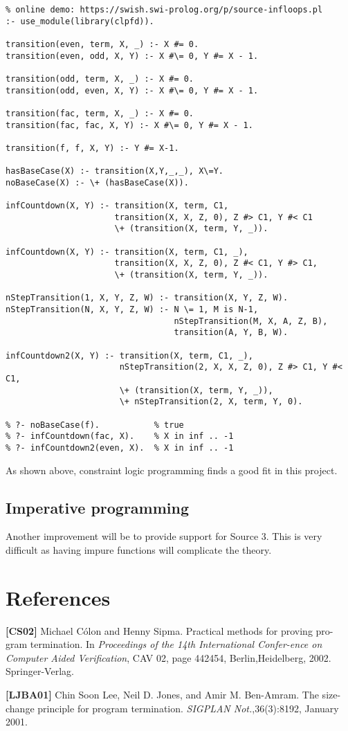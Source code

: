 \begin{lstlisting}
% online demo: https://swish.swi-prolog.org/p/source-infloops.pl 
:- use_module(library(clpfd)).

transition(even, term, X, _) :- X #= 0.
transition(even, odd, X, Y) :- X #\= 0, Y #= X - 1.

transition(odd, term, X, _) :- X #= 0.
transition(odd, even, X, Y) :- X #\= 0, Y #= X - 1.

transition(fac, term, X, _) :- X #= 0.
transition(fac, fac, X, Y) :- X #\= 0, Y #= X - 1.

transition(f, f, X, Y) :- Y #= X-1.

hasBaseCase(X) :- transition(X,Y,_,_), X\=Y.
noBaseCase(X) :- \+ (hasBaseCase(X)).

infCountdown(X, Y) :- transition(X, term, C1, 
                      transition(X, X, Z, 0), Z #> C1, Y #< C1
                      \+ (transition(X, term, Y, _)).

infCountdown(X, Y) :- transition(X, term, C1, _),
                      transition(X, X, Z, 0), Z #< C1, Y #> C1,
                      \+ (transition(X, term, Y, _)).

nStepTransition(1, X, Y, Z, W) :- transition(X, Y, Z, W).
nStepTransition(N, X, Y, Z, W) :- N \= 1, M is N-1,
                                  nStepTransition(M, X, A, Z, B),
                                  transition(A, Y, B, W).

infCountdown2(X, Y) :- transition(X, term, C1, _),
                       nStepTransition(2, X, X, Z, 0), Z #> C1, Y #< C1,
                       \+ (transition(X, term, Y, _)),
                       \+ nStepTransition(2, X, term, Y, 0).

% ?- noBaseCase(f).           % true
% ?- infCountdown(fac, X).    % X in inf .. -1
% ?- infCountdown2(even, X).  % X in inf .. -1
\end{lstlisting}

As shown above, constraint logic programming finds a good fit in this project. 

\subsection{Imperative programming}
Another improvement will be to provide support for Source 3. This is very difficult
as having impure functions will complicate the theory.

\section{References}
\textbf{[CS02]} Michael C\'olon and Henny Sipma. Practical methods for proving pro-gram termination.  In {\it Proceedings  of  the  14th  International  Confer-ence on Computer Aided Verification}, CAV 02, page 442454, Berlin,Heidelberg, 2002. Springer-Verlag.



\textbf{[LJBA01]}  Chin  Soon  Lee,  Neil  D.  Jones,  and  Amir  M.  Ben-Amram.    The size-change  principle  for  program  termination. {\it SIGPLAN  Not.},36(3):8192, January 2001.


